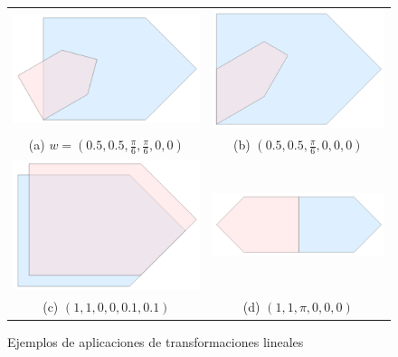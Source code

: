 \begin{figure}[ht]
    \centering
    \begin{tabular}{cc}
      \includegraphics[scale=0.65]{./img/C4/ejemplo-ta-1.png} &   \includegraphics[scale=0.6]{./img/C4/ejemplo-ta-2.png} \\
    (a) $w=(0.5, 0.5, \frac{\pi}{6}, \frac{\pi}{6}, 0,0)$ & (b) $(0.5, 0.5, \frac{\pi}{6}, 0,0,0)$ \\[6pt]
    \includegraphics[scale=0.6]{./img/C4/ejemplo-ta-3.png} &   \includegraphics[scale=0.75]{./img/C4/ejemplo-ta-4.png} \\
    (c) $(1,1,0,0,0.1,0.1)$ & (d) $(1,1,\pi,0,0,0)$ \\[6pt]
    \end{tabular}
    \caption{Ejemplos de aplicaciones de transformaciones lineales}
    \label{fig:ejemplos-ta}
  \end{figure}


